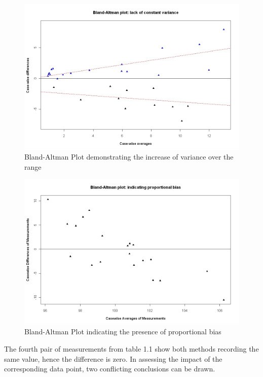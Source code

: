 \documentclass[12pt, a4paper]{report}
\begin{document}
\newpage
\begin{figure}[h!]
\begin{center}
  \includegraphics[width=125mm]{BAFanEffect.jpeg}
  \caption{Bland-Altman Plot demonstrating the increase of variance over the range}\label{BAFanEffect}
\end{center}
\end{figure}
\begin{figure}[h!]
\begin{center}
  \includegraphics[width=125mm]{PropBias.jpeg}
  \caption{Bland-Altman Plot indicating the presence of proportional bias}\label{PropBias}
\end{center}
\end{figure}
\newpage



The fourth pair of measurements from table 1.1 show both methods
recording the same value, hence the difference is zero. In
assessing the impact of the corresponding data point, two
conflicting conclusions can be drawn.
\end{document}
